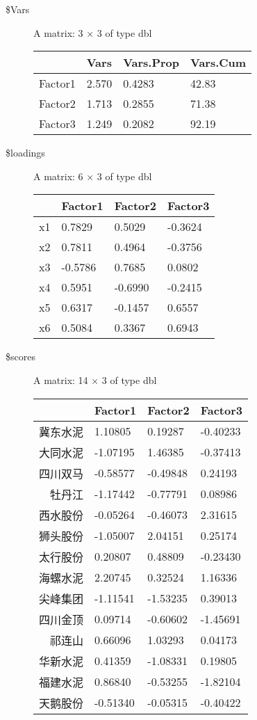 \documentclass[UTF8,a4paper]{ctexart}
\begin{document}
    \begin{description}
\item[\$Vars] A matrix: 3 × 3 of type dbl
\begin{tabular}{r|lll}
  & Vars & Vars.Prop & Vars.Cum\\
\hline
	Factor1 & 2.570 & 0.4283 & 42.83\\
	Factor2 & 1.713 & 0.2855 & 71.38\\
	Factor3 & 1.249 & 0.2082 & 92.19\\
\end{tabular}

\item[\$loadings] A matrix: 6 × 3 of type dbl
\begin{tabular}{r|lll}
  & Factor1 & Factor2 & Factor3\\
\hline
	x1 &  0.7829 &  0.5029 & -0.3624\\
	x2 &  0.7811 &  0.4964 & -0.3756\\
	x3 & -0.5786 &  0.7685 &  0.0802\\
	x4 &  0.5951 & -0.6990 & -0.2415\\
	x5 &  0.6317 & -0.1457 &  0.6557\\
	x6 &  0.5084 &  0.3367 &  0.6943\\
\end{tabular}

\item[\$scores] A matrix: 14 × 3 of type dbl
\begin{tabular}{r|lll}
  & Factor1 & Factor2 & Factor3\\
\hline
	冀东水泥 &  1.10805 &  0.19287 & -0.40233\\
	大同水泥 & -1.07195 &  1.46385 & -0.37413\\
	四川双马 & -0.58577 & -0.49848 &  0.24193\\
	牡丹江 & -1.17442 & -0.77791 &  0.08986\\
	西水股份 & -0.05264 & -0.46073 &  2.31615\\
	狮头股份 & -1.05007 &  2.04151 &  0.25174\\
	太行股份 &  0.20807 &  0.48809 & -0.23430\\
	海螺水泥 &  2.20745 &  0.32524 &  1.16336\\
	尖峰集团 & -1.11541 & -1.53235 &  0.39013\\
	四川金顶 &  0.09714 & -0.60602 & -1.45691\\
	祁连山 &  0.66096 &  1.03293 &  0.04173\\
	华新水泥 &  0.41359 & -1.08331 &  0.19805\\
	福建水泥 &  0.86840 & -0.53255 & -1.82104\\
	天鹅股份 & -0.51340 & -0.05315 & -0.40422\\
\end{tabular}


\end{description}
\end{document}
